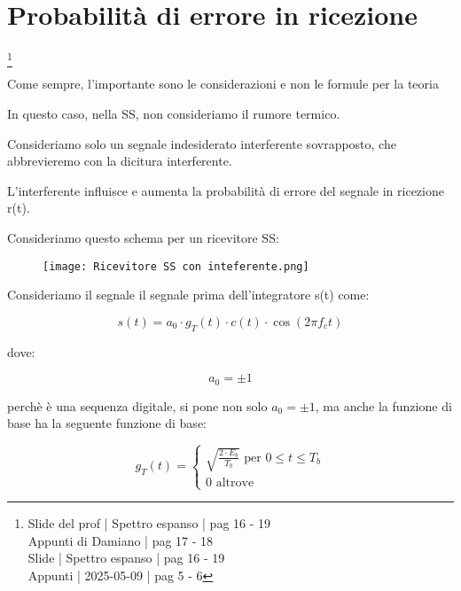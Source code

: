 \newpage 

\section{Probabilità di errore in ricezione}
\footnote{Slide del prof | Spettro espanso | pag 16 - 19\\
Appunti di Damiano | pag 17 - 18\\ 
Slide | Spettro espanso | pag 16 - 19 \\
Appunti | 2025-05-09 | pag 5 - 6
} 

\begin{tcolorbox}
Come sempre, l'importante sono le considerazioni e non le formule per la teoria    
\end{tcolorbox}

In questo caso, nella SS, 
non consideriamo il rumore termico. \newline 

Consideriamo solo un segnale indesiderato interferente sovrapposto, 
che abbrevieremo con la dicitura interferente. \newline 

L'interferente influisce e aumenta la probabilità di errore del segnale in ricezione r(t). \newline 

Consideriamo questo schema per un ricevitore SS: 

\begin{figure}[h]
    \centering
    \texttt{[image: Ricevitore SS con inteferente.png]}
\end{figure}

Consideriamo il segnale il segnale prima dell'integratore s(t) come: 

{
    \Large 
    \begin{equation}
        s(t)
        = 
        a_0 
        \cdot 
        g_T(t)
        \cdot 
        c(t)
        \cdot 
        \cos(2 \pi f_c t)
    \end{equation}
}

dove: 

{
    \Large 
    \begin{equation}
        a_0 = \pm 1
    \end{equation}
}

perchè è una sequenza digitale, 
si pone non solo $a_0 = \pm 1$, 
ma anche la funzione di base ha la seguente funzione di base:  

{
    \Large 
    \begin{equation}
        g_T (t)
        = 
        \begin{cases}
            \sqrt{\frac{2 \cdot E_b}{T_b}}
            \text{ per }
            0 \le t \le T_b 
            \\
            0 
            \text{ altrove}
        \end{cases}
    \end{equation}
}

